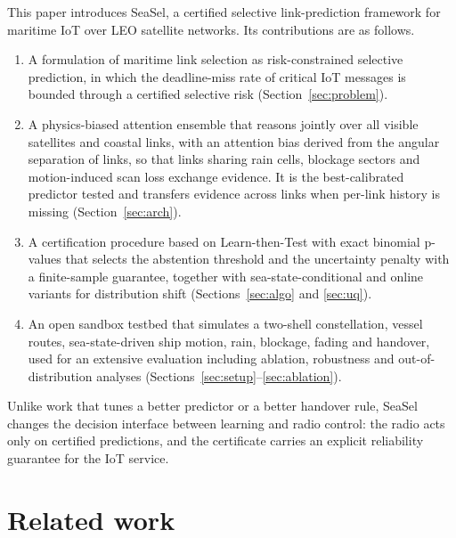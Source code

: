 This paper introduces SeaSel, a certified selective link-prediction framework for maritime IoT over LEO satellite networks. Its contributions are as follows.
\begin{enumerate}
\item A formulation of maritime link selection as risk-constrained selective prediction, in which the deadline-miss rate of critical IoT messages is bounded through a certified selective risk (Section~\ref{sec:problem}).
\item A physics-biased attention ensemble that reasons jointly over all visible satellites and coastal links, with an attention bias derived from the angular separation of links, so that links sharing rain cells, blockage sectors and motion-induced scan loss exchange evidence. It is the best-calibrated predictor tested and transfers evidence across links when per-link history is missing (Section~\ref{sec:arch}).
\item A certification procedure based on Learn-then-Test with exact binomial p-values that selects the abstention threshold and the uncertainty penalty with a finite-sample guarantee, together with sea-state-conditional and online variants for distribution shift (Sections~\ref{sec:algo} and \ref{sec:uq}).
\item An open sandbox testbed that simulates a two-shell constellation, vessel routes, sea-state-driven ship motion, rain, blockage, fading and handover, used for an extensive evaluation including ablation, robustness and out-of-distribution analyses (Sections~\ref{sec:setup}--\ref{sec:ablation}).
\end{enumerate}
Unlike work that tunes a better predictor or a better handover rule, SeaSel changes the decision interface between learning and radio control: the radio acts only on certified predictions, and the certificate carries an explicit reliability guarantee for the IoT service.

\section{Related work}\label{sec:related}
